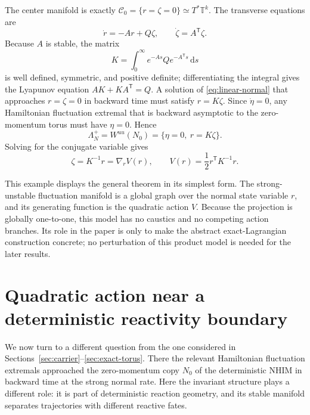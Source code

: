 \documentclass[11pt]{article}
\theoremstyle{definition}
\theoremstyle{remark}
\newcommand{\T}{\mathbb{T}}
\newcommand{\C}{\mathcal{C}}
\newcommand{\Lagr}{\Lambda}
\newcommand{\dd}{\mathrm{d}}
\newcommand{\cT}{\mathsf{T}}
\begin{document}
The center manifold is exactly $\C_0=\{r=\zeta=0\}\simeq T^*\T^k$.  The transverse equations are
\begin{equation}
\dot r=-Ar+Q\zeta,
\qquad
\dot\zeta=A^{\cT}\zeta.
\label{eq:linear-normal}
\end{equation}
Because $A$ is stable, the matrix
\begin{equation}
K=\int_0^\infty e^{-As}Qe^{-A^{\cT}s}\,\dd s
\label{eq:lyapunov-K}
\end{equation}
is well defined, symmetric, and positive definite; differentiating the integral gives the Lyapunov equation $AK+KA^{\cT}=Q$.  A solution of \eqref{eq:linear-normal} that approaches $r=\zeta=0$ in backward time must satisfy $r=K\zeta$.  Since $\dot\eta=0$, any Hamiltonian fluctuation extremal that is backward asymptotic to the zero-momentum torus must have $\eta=0$.  Hence
\begin{equation}
\Lagr_N^+=W^{uu}(N_0)=\{\eta=0,\ r=K\zeta\}.
\label{eq:linear-Lambda}
\end{equation}
Solving for the conjugate variable gives
\begin{equation}
\zeta=K^{-1}r=\nabla_rV(r),
\qquad
V(r)=\frac12r^{\cT}K^{-1}r.
\label{eq:linear-quasi}
\end{equation}

This example displays the general theorem in its simplest form.  The strong-unstable fluctuation manifold is a global graph over the normal state variable $r$, and its generating function is the quadratic action $V$.  Because the projection is globally one-to-one, this model has no caustics and no competing action branches.  Its role in the paper is only to make the abstract exact-Lagrangian construction concrete; no perturbation of this product model is needed for the later results.

\section{Quadratic action near a deterministic reactivity boundary}
\label{sec:switching-law}

We now turn to a different question from the one considered in Sections~\ref{sec:carrier}--\ref{sec:exact-torus}.  There the relevant Hamiltonian fluctuation extremals approached the zero-momentum copy $N_0$ of the deterministic NHIM in backward time at the strong normal rate.  Here the invariant structure plays a different role: it is part of deterministic reaction geometry, and its stable manifold separates trajectories with different reactive fates.
\end{document}
